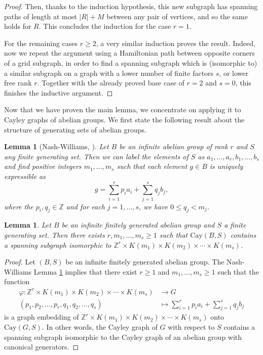 \documentclass[reqno,oneside]{amsart}
\newcommand{\cay}[2]{\mathrm{Cay}(#1,#2)}
\newcommand{\Z}{\mathbb{Z}}
\theoremstyle{plain}
\newtheorem{lem}[thm]{Lemma}
\theoremstyle{definition}
\begin{document}
\begin{proof}
	Then, thanks to the induction hypothesis, this new subgraph has spanning paths of length at most $|R|+M$ between any pair of vertices, and so the same holds for $R$. This concludes the induction for the case $r=1$.
	
	For the remaining cases $r\ge 2$, a very similar induction proves the result. Indeed, now we repeat the argument using a Hamiltonian path between opposite corners of a grid subgraph, in order to find a spanning subgraph which is (isomorphic to) a similar subgraph on a graph with a lower number of finite factors $s$, or lower free rank $r$. Together with the already proved base case of $r=2$ and $s=0$, this finishes the inductive argument.
\end{proof}

Now that we have proven the main lemma, we concentrate on applying it to Cayley graphs of abelian groups. We first state the following result about the structure of generating sets of abelian groups.
\begin{lem}[Nash-Williams, \cite{NashWilliams1959}]\label{lem: Nash williams gensets of abelian groups} Let $B$ be an infinite abelian group of rank $r$ and $S$ any finite generating set. Then we can label the elements of $S$ as $a_1,\ldots,a_r,b_1,\ldots,b_s$ and find positive integers $m_1,\ldots,m_s$ such that each element $g\in B$ is uniquely expressible as
	$$
	g=\sum_{i=1}^{r}p_i a_i + \sum_{j=1}^s q_jb_j,
	$$ 
	where the $p_i,q_j\in \Z$ and for each $j=1,\ldots,s$, we have $0\le q_j<m_j$.
\end{lem}


\begin{lem}\label{lem: reducing any abelian generators to the canonical case}
	Let $B$ be an infinite finitely generated abelian group and $S$ a finite generating set. Then there exists $r,m_1,\ldots,m_s\ge 1$ such that $\cay{B}{S}$ contains a spanning subgraph isomorphic to $\Z^r\times K(m_1)\times K(m_2)\times \cdots \times K(m_s)$.
\end{lem}
\begin{proof}
	Let $(B,S)$ be an infinite finitely generated abelian group. The Nash-Williams Lemma \ref{lem: Nash williams gensets of abelian groups} implies that there exist $r\ge 1$ and $m_1,\ldots,m_s\ge 1$ such that the function
	\begin{align*}
	\varphi:\Z^r\times K(m_1)\times K(m_2)\times \cdots \times K(m_s)&\to G \\
	(p_1,p_2,\ldots,p_r,q_1,q_2,\ldots,q_s)&\mapsto \sum_{i=1}^r p_i a_i + \sum_{j=1}^s q_j b_j
	\end{align*}
	is a graph embedding of $\Z^r\times K(m_1)\times K(m_2)\times \cdots \times K(m_s)$ onto $\cay{G}{S}$. In other words, the Cayley graph of $G$ with respect to $S$ contains a spanning subgraph isomorphic to the Cayley graph of an abelian group with canonical generators. 
\end{proof}
\end{document}
